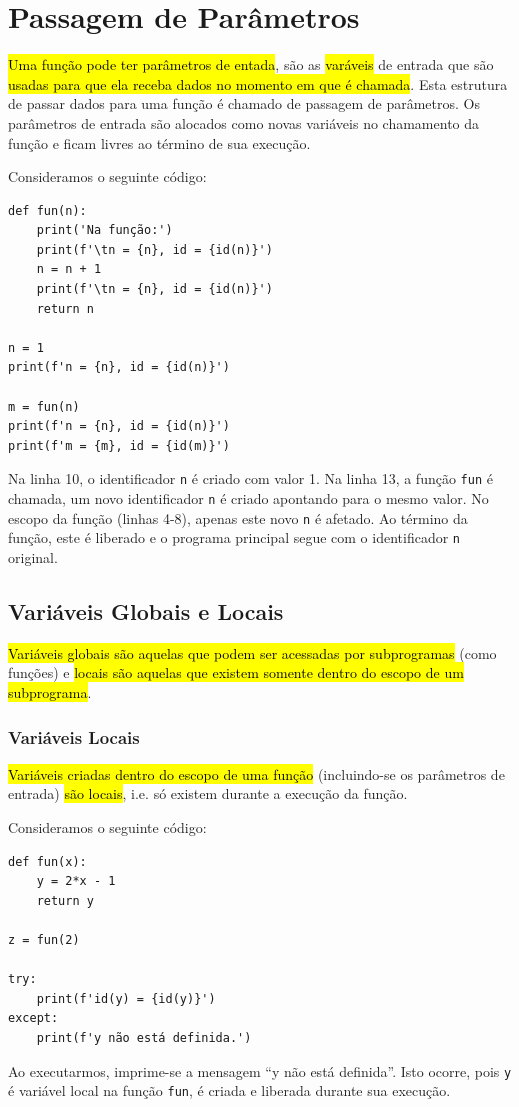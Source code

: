 \section{Passagem de Parâmetros}\label{cap_fun_sec_params}

\hl{Uma função pode ter parâmetros de entada}, são as \hl{varáveis} de entrada que são \hl{usadas para que ela receba dados no momento em que é chamada}. Esta estrutura de passar dados para uma função é chamado de passagem de parâmetros. Os parâmetros de entrada são alocados como novas variáveis no chamamento da função e ficam livres ao término de sua execução.

\begin{ex}
  Consideramos o seguinte código:
\begin{lstlisting}
def fun(n):
    print('Na função:')
    print(f'\tn = {n}, id = {id(n)}')
    n = n + 1
    print(f'\tn = {n}, id = {id(n)}')
    return n

n = 1
print(f'n = {n}, id = {id(n)}')

m = fun(n)
print(f'n = {n}, id = {id(n)}')
print(f'm = {m}, id = {id(m)}')
\end{lstlisting}
  Na linha 10, o identificador \lstinline+n+ é criado com valor 1. Na linha 13, a função \lstinline+fun+ é chamada, um novo identificador \lstinline+n+ é criado apontando para o mesmo valor. No escopo da função (linhas 4-8), apenas este novo \lstinline+n+ é afetado. Ao término da função, este é liberado e o programa principal segue com o identificador \lstinline+n+ original.
\end{ex}

\subsection{Variáveis Globais e Locais}

\hl{Variáveis globais são aquelas que podem ser acessadas por subprogramas} (como funções) e \hl{locais são aquelas que existem somente dentro do escopo de um subprograma}.

\subsubsection{Variáveis Locais}

\hl{Variáveis criadas dentro do escopo de uma função} (incluindo-se os parâmetros de entrada) \hl{são locais}, i.e. só existem durante a execução da função.

\begin{ex}
  Consideramos o seguinte código:
\begin{lstlisting}
def fun(x):
    y = 2*x - 1
    return y

z = fun(2)

try:
    print(f'id(y) = {id(y)}')
except:
    print(f'y não está definida.')
\end{lstlisting}
  Ao executarmos, imprime-se a mensagem ``y não está definida''. Isto ocorre, pois \lstinline+y+ é variável local na função \lstinline+fun+, é criada e liberada durante sua execução.
\end{ex}

